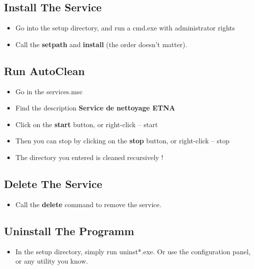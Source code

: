 \documentclass{article}
\begin{document}
\subsection{Install The Service}
\begin{itemize}
	\item Go into the setup directory, and run a cmd.exe with administrator rights
	\item Call the \textbf{setpath} and \textbf{install} (the order doesn't matter).
\end{itemize}

\subsection{Run AutoClean}
\begin{itemize}
	\item Go in the services.msc
	\item Find the description \textbf{Service de nettoyage ETNA}
	\item Click on the \textbf{start} button, or right-click -- start
	\item Then you can stop by clicking on the \textbf{stop} button, or right-click -- stop
	\item The directory you entered is cleaned recursively !
\end{itemize}

\subsection{Delete The Service}
\begin{itemize}
	\item Call the \textbf{delete} command to remove the service.
\end{itemize}

\subsection{Uninstall The Programm}
\begin{itemize}
	\item In the setup directory, simply run uninst*.exe. Or use the configuration panel, or any utility you know.
\end{itemize}


\end{document}
